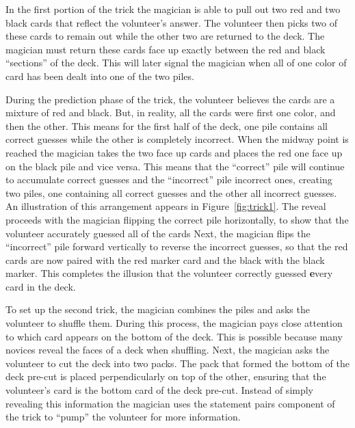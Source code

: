 In the first portion of the trick the magician is able to
pull out two red and two black cards that reflect the volunteer's answer.  The
volunteer then picks two of these cards to remain out while the other two are
returned to the deck.  The magician must return these cards face
up exactly between the red and black ``sections'' of the deck.
This will later signal the magician when all of one color of card
has been dealt into one of the two piles.

During the prediction phase of the trick, the volunteer believes the 
cards are a mixture of red and black.
But, in reality,
all the cards were first one color,  and then 
the other.
This means for the first half of the deck, one pile contains all correct
guesses while the other is completely incorrect.
When the midway point is reached the magician takes the two face up cards and places the
red one face up on the black pile and vice versa.
This means that the ``correct'' pile will continue to accumulate correct
guesses and the ``incorrect'' pile incorrect ones, creating
two piles,
one containing all correct guesses and the other
all incorrect guesses.
An illustration of this arrangement appears in Figure~\ref{fig:trick1}.
The reveal proceeds with the magician flipping the correct pile horizontally, to show that the volunteer accurately guessed all of the cards
Next, the magician flips the ``incorrect'' pile forward vertically to 
reverse the incorrect guesses, so that the red cards are now paired
with the red marker card and the black with the black marker.  This completes
the illusion that the volunteer correctly guessed {\textbf every} card in the
deck.

To set up the second trick, the magician combines the piles and asks the
volunteer to shuffle them.  During this process, the magician pays close
attention to which card appears on the bottom of the deck.  This is possible
because many novices reveal the faces of a deck when shuffling.  Next,
the magician asks the volunteer to cut the deck into two packs.  The pack that
formed the bottom of the deck pre-cut is placed perpendicularly on
top of the other, ensuring that the volunteer's card is the bottom card of
the deck pre-cut. Instead of simply revealing this information the
magician uses the statement pairs component of the trick to ``pump'' the volunteer
for more information.

%



